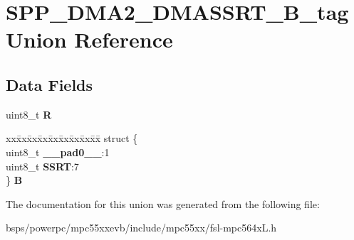 \hypertarget{unionSPP__DMA2__DMASSRT__8B__tag}{}\section{S\+P\+P\+\_\+\+D\+M\+A2\+\_\+\+D\+M\+A\+S\+S\+R\+T\+\_\+B\+\_\+tag Union Reference}
\label{unionSPP__DMA2__DMASSRT__8B__tag}
\subsection*{Data Fields}
\begin{DoxyCompactItemize}
\item 
\mbox{\label{unionSPP__DMA2__DMASSRT__8B__tag_a00233e1fa261d9709b69b9bd1f1531e5}} 
uint8\+\_\+t {\bfseries R}
\item 
\mbox{\label{unionSPP__DMA2__DMASSRT__8B__tag_a6ff2cf118056ac109444e87616df8ece}} 
\begin{tabbing}
xx\=xx\=xx\=xx\=xx\=xx\=xx\=xx\=xx\=\kill
struct \{\\
\>uint8\_t {\bfseries \_\_pad0\_\_}:1\\
\>uint8\_t {\bfseries SSRT}:7\\
\} {\bfseries B}\\

\end{tabbing}\end{DoxyCompactItemize}


The documentation for this union was generated from the following file\+:\begin{DoxyCompactItemize}
\item 
bsps/powerpc/mpc55xxevb/include/mpc55xx/fsl-\/mpc564x\+L.\+h\end{DoxyCompactItemize}

